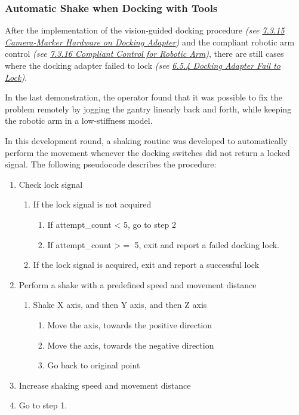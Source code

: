 \documentclass[11pt]{book}
\begin{document}
\subsubsection{Automatic Shake when Docking with Tools}

After the implementation of the vision-guided docking procedure \textit{(see \uline{7.3.15 Camera-Marker Hardware on Docking Adapter})} and the compliant robotic arm control \textit{(see \uline{7.3.16 Compliant Control for Robotic Arm})}, there are still cases where the docking adapter failed to lock \textit{(see \uline{6.5.4 Docking Adapter Fail to Lock})}.

In the last demonstration, the operator found that it was possible to fix the problem remotely by jogging the gantry linearly back and forth, while keeping the robotic arm in a low-stiffness model. 

In this development round, a shaking routine was developed to automatically perform the movement whenever the docking switches did not return a locked signal. The following pseudocode describes the procedure:

\begin{enumerate}
	\item Check lock signal

\begin{enumerate}
	\item If the lock signal is not acquired

\begin{enumerate}
	\item If attempt\_count < 5, go to step 2

	\item If attempt\_count >$=$ 5, exit and report a failed docking lock.

\end{enumerate}
	\item If the lock signal is acquired, exit and report a successful lock

\end{enumerate}
	\item Perform a shake with a predefined speed and movement distance

\begin{enumerate}
	\item Shake X axis, and then Y axis, and then Z axis

\begin{enumerate}
	\item Move the axis, towards the positive direction

	\item Move the axis, towards the negative direction

	\item Go back to original point

\end{enumerate}
\end{enumerate}
	\item Increase shaking speed and movement distance

	\item Go to step 1.

\end{enumerate}
\end{document}
